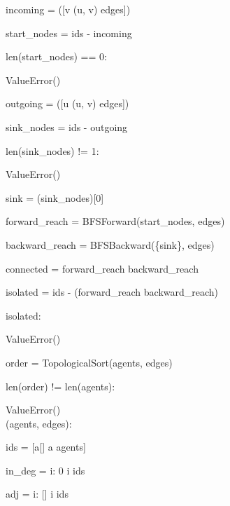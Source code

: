 \begin{subagent}[title=高 DoM 解析器]
\quad incoming = ([v  (u, v)  edges])

\quad start\_nodes = ids - incoming

\quad {} len(start\_nodes) == 0:

\quad\quad {} ValueError() \\


\quad {}

\quad outgoing = ([u  (u, v)  edges])

\quad sink\_nodes = ids - outgoing

\quad {} len(sink\_nodes) != 1:

\quad\quad {} ValueError() \\


\quad {}

\quad sink = (sink\_nodes)[0]

\quad forward\_reach = BFSForward(start\_nodes, edges)

\quad backward\_reach = BFSBackward(\{sink\}, edges)

\quad connected = forward\_reach  backward\_reach

\quad isolated = ids - (forward\_reach \pykw{\&} backward\_reach)

\quad {} isolated:

\quad\quad {} ValueError() \\


\quad {}

\quad order = TopologicalSort(agents, edges)

\quad {} len(order) != len(agents):

\quad\quad {} ValueError() \\



 (agents, edges):

\quad {}

\quad ids = [a[]  a  agents]

\quad in\_deg = \code{\{}i: 0  i  ids\code{\}}

\quad adj = \code{\{}i: []  i  ids\code{\}}


\end{subagent}
